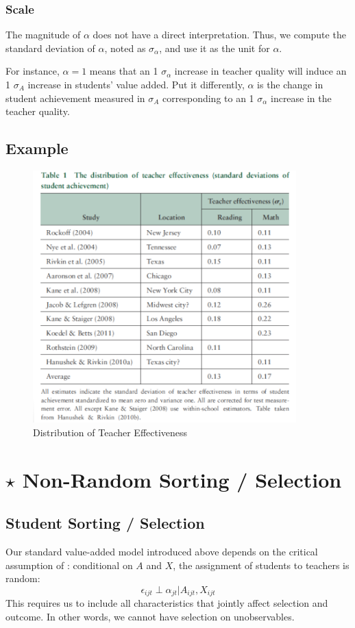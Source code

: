         \subsubsection{Scale}
            The magnitude of $\alpha$ does not have a direct interpretation. Thus, we compute the standard deviation of $\alpha$, noted as $\sigma_\alpha$, and use it as the unit for $\alpha$.

            For instance, $\alpha=1$ means that an 1 $\sigma_\alpha$ increase in teacher quality will induce an 1 $\sigma_A$ increase in students' value added. Put it differently, $\alpha$ is the change in student achievement measured in $\sigma_A$ corresponding to an 1 $\sigma_\alpha$ increase in the teacher quality.
        
    
    \subsection{Example}

        \begin{figure}[H]
            \centering
            \includegraphics[width=4in]{images/ch9/9 hanushek rivkin.png}
            \caption{Distribution of Teacher Effectiveness}
        \end{figure}
        

\section{$\star$ Non-Random Sorting / Selection}
    
    \subsection{Student Sorting / Selection}
        Our standard value-added model introduced above depends on the critical assumption of : conditional on $A$ and $X$, the assignment of students to teachers is random:
        $$\epsilon_{ijt}\perp \alpha_{jt}|A_{ijt},X_{ijt}$$
        This requires us to include all characteristics that jointly affect selection and outcome. In other words, we cannot have selection on unobservables.
        
